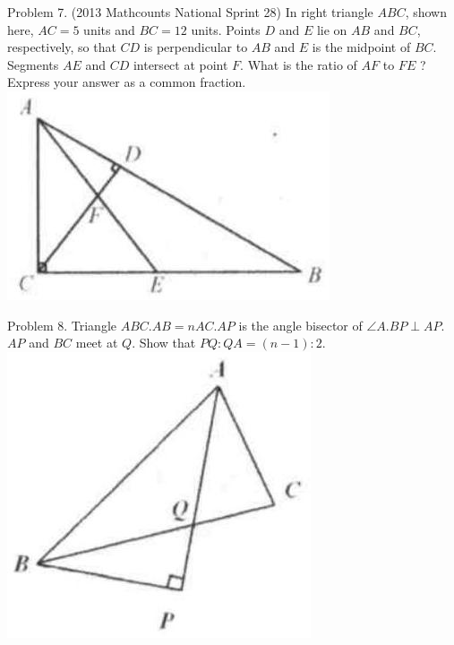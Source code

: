 \documentclass[10pt]{article}
\begin{document}
Problem 7. (2013 Mathcounts National Sprint 28) In right triangle \(A B C\), shown here, \(A C=5\) units and \(B C=12\) units. Points \(D\) and \(E\) lie on \(A B\) and \(B C\), respectively, so that \(C D\) is perpendicular to \(A B\) and \(E\) is the midpoint of \(B C\). Segments \(A E\) and \(C D\) intersect at point \(F\). What is the ratio of \(A F\) to \(F E\) ? Express your answer as a common fraction.\\
\includegraphics[max width=\textwidth, center]{2025_04_17_97bc1f7e44d93c271a88g-127(1)}

Problem 8. Triangle \(A B C . A B=n A C . A P\) is the angle bisector of \(\angle A . B P \perp A P\). \(A P\) and \(B C\) meet at \(Q\). Show that \(P Q: Q A=(n-1): 2\).\\
\includegraphics[max width=\textwidth, center]{2025_04_17_97bc1f7e44d93c271a88g-127(4)}
\end{document}
